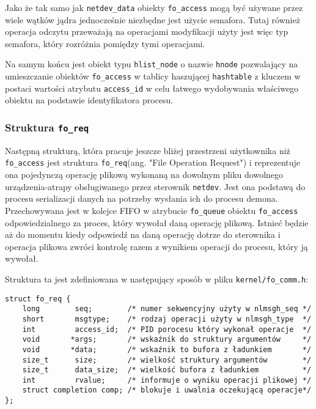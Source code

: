 \documentclass[10pt]{scrartcl}
\begin{document}
Jako że tak samo jak \texttt{netdev\_data} obiekty \texttt{fo\_access} mogą być używane przez wiele wątków jądra jednocześnie niezbędne jest użycie semafora. Tutaj również operacja odczytu przeważają na operacjami modyfikacji użyty jest więc typ semafora, który rozróżnia pomiędzy tymi operacjami.

Na samym końcu jest obiekt typu \texttt{hlist\_node} o nazwie \texttt{hnode} pozwalający na umieszczanie obiektów \texttt{fo\_access} w tablicy haszującej \texttt{hashtable} z kluczem w postaci wartości atrybutu \texttt{access\_id} w celu łatwego wydobywania właściwego obiektu na podstawie identyfikatora procesu.

\subsubsection{Struktura \texttt{\large{fo\_req}}}

Następną strukturą, która pracuje jeszcze bliżej przestrzeni użytkownika niż \texttt{fo\_access} jest struktura \texttt{fo\_req}(ang. "File Operation Request") i reprezentuje ona pojedynczą operację plikową wykonaną na dowolnym pliku dowolnego urządzenia-atrapy obsługiwanego przez sterownik \texttt{netdev}. Jest ona podstawą do procesu serializacji danych na potrzeby wysłania ich do procesu demona.  Przechowywana jest w kolejce FIFO w atrybucie \texttt{fo\_queue} obiektu \texttt{fo\_access} odpowiedzialnego za proces, który wywołał daną operację plikową. Istnieć będzie aż do momentu kiedy odpowiedź na daną operację dotrze do sterownika i operacja plikowa zwróci kontrolę razem z wynikiem operacji do procesu, który ją wywołał.

Struktura ta jest zdefiniowana w następujący sposób w pliku \texttt{kernel/fo\_comm.h}:

\begin{verbatim}
struct fo_req {
    long        seq;        /* numer sekwencyjny użyty w nlmsgh_seq */
    short       msgtype;    /* rodzaj operacji użyty w nlmsgh_type  */
    int         access_id;  /* PID porocesu który wykonał operacje  */
    void       *args;       /* wskaźnik do struktury argumentów     */
    void       *data;       /* wskaźnik to bufora z ładunkiem       */
    size_t      size;       /* wielkość struktury argumentów        */
    size_t      data_size;  /* wielkość bufora z ładunkiem          */
    int         rvalue;     /* informuje o wyniku operacji plikowej */
    struct completion comp; /* blokuje i uwalnia oczekującą operacje*/
};
\end{verbatim}
\end{document}
